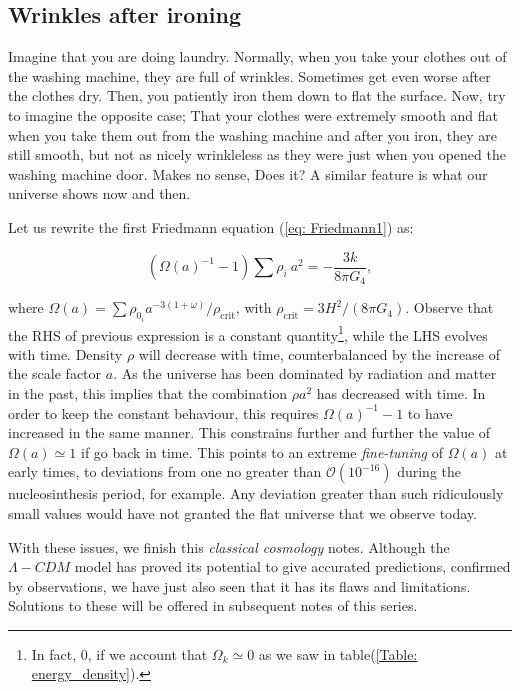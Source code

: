 \documentclass[11pt, a4paper]{article} %
\begin{document}
\subsection*{Wrinkles after ironing}

Imagine that you are doing laundry. Normally, when you take your clothes out of the washing machine, they are full of wrinkles. Sometimes get even worse after the clothes dry. Then, you patiently iron them down to flat the surface. Now, try to imagine the opposite case; That your clothes were extremely smooth and flat when you take them out from the washing machine and after you iron, they are still smooth, but not as nicely wrinkleless as they were just when you opened the washing machine door. Makes no sense, Does it? A similar feature is what our universe shows now and then.

Let us rewrite the first Friedmann equation (\ref{eq: Friedmann1}) as:

\begin{equation}\label{eq: divergence_Friedmann}
	\left(\Omega(a)^{-1} - 1\right) \sum \rho_{i} \: a^{2} = -\frac{3k}{8 \pi G_{4}},
\end{equation}

where $\Omega(a) = \sum \rho_{0_{i}} a^{-3(1+\omega)}/\rho_{\text{crit}}$, with $\rho_{\text{crit}} = 3 H^{2}/(8 \pi G_{4})$. Observe that the RHS of previous expression is a constant quantity\footnote{In fact, 0, if we account that $\Omega_{k} \simeq 0$ as we saw in table(\ref{Table: energy_density}).}, while the LHS evolves with time. Density $\rho$ will decrease with time, counterbalanced by the increase of the scale factor $a$. As the universe has been dominated by radiation and matter in the past, this implies that the combination $\rho a^{2}$ has decreased with time. In order to keep the constant behaviour, this requires $\Omega(a)^{-1} -1$ to have increased in the same manner. This constrains further and further the value of $\Omega(a) \simeq 1$ if go back in time. This points to an extreme \textit{fine-tuning} of $\Omega(a)$ at early times, to deviations from one no greater than $\mathcal{O}(10^{-16})$ during the nucleosinthesis period, for example. Any deviation greater than such ridiculously small values would have not granted the flat universe that we observe today.
\vspace{1cm}

With these issues, we finish this \textit{classical cosmology} notes. Although the $\Lambda-CDM$ model has proved its potential to give accurated predictions, confirmed by observations, we have just also seen that it has its flaws and limitations. Solutions to these will be offered in subsequent notes of this series.








\end{document}
